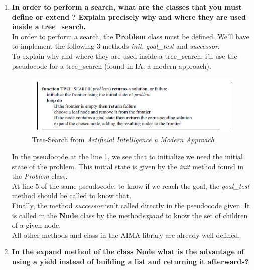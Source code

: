 \documentclass[10pt,a4paper]{article}
\begin{document}
\begin{enumerate}
	\item \textbf{In order to perform a search, what are the classes that you must define or extend ? Explain precisely why and where they are used inside a tree\_search.} \\

	
	In order to perform a search, the \textbf{Problem} class must be defined. We'll have to implement the following 3 methods  \textit{init}, \textit{goal\_test} and \textit{successor}. \\
	To explain why and where they are used inside a tree\_search, i'll use the pseudocode for a tree\_search (found in IA: a modern approach).\\
	
		
\begin{figure}[!h] %
\includegraphics{Tree-Search.png} %
\caption{Tree-Search from \textit{Artificial Intelligence a Modern Approach}} %
\label{image_soleil} %
\end{figure} %
	
	In the pseudocode at the line 1, we see that to initialize we need the initial state of the problem. This initial state is given by the \textit{init} method found in the \textit{Problem} class.\\
	At line 5 of the same pseudocode, to know if we reach the goal, the \textit{goal\_test} method should be called to know that.\\
	Finally, the method \textit{successor} isn't called directly in the pseudocode given. It is called in the \textbf{Node} class by the method\textit{expand} to know the set of children of a given node.\\
	
	All other methods and class in the AIMA library are already well defined.
	
	\item \textbf{In the expand method of the class Node what is the advantage of using a yield instead of building a list and returning it afterwards?} \\
	

\end{enumerate}
\end{document}
